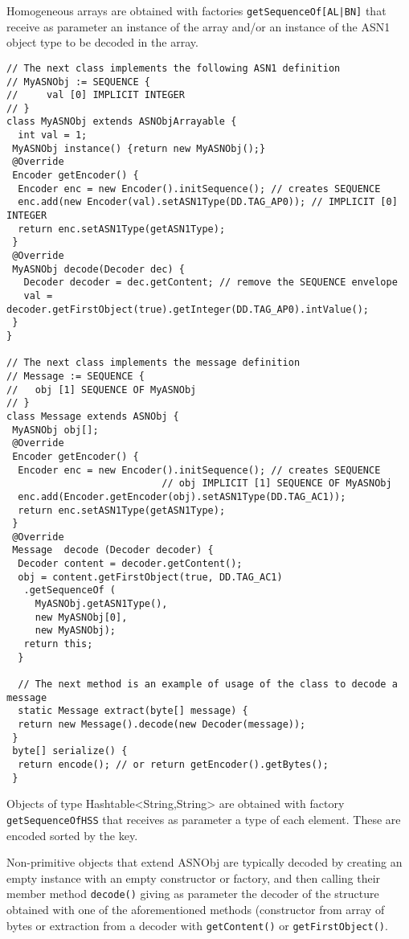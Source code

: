 \documentclass{book}
\newcommand{\mth}[1]{{\tt #1}}
\begin{document}
Homogeneous arrays are obtained with factories \mth{getSequenceOf[AL|BN]} that receive as parameter an instance of the array and/or an
instance of the ASN1 object type to be decoded in the array.

\begin{verbatim}
// The next class implements the following ASN1 definition
// MyASNObj := SEQUENCE {
//     val [0] IMPLICIT INTEGER
// }
class MyASNObj extends ASNObjArrayable {
  int val = 1;
 MyASNObj instance() {return new MyASNObj();}
 @Override
 Encoder getEncoder() {
  Encoder enc = new Encoder().initSequence(); // creates SEQUENCE
  enc.add(new Encoder(val).setASN1Type(DD.TAG_AP0)); // IMPLICIT [0] INTEGER
  return enc.setASN1Type(getASN1Type);
 }
 @Override
 MyASNObj decode(Decoder dec) {
   Decoder decoder = dec.getContent; // remove the SEQUENCE envelope
   val = decoder.getFirstObject(true).getInteger(DD.TAG_AP0).intValue();
 }
}

// The next class implements the message definition
// Message := SEQUENCE {
//   obj [1] SEQUENCE OF MyASNObj
// }
class Message extends ASNObj {
 MyASNObj obj[];
 @Override
 Encoder getEncoder() {
  Encoder enc = new Encoder().initSequence(); // creates SEQUENCE
                           // obj IMPLICIT [1] SEQUENCE OF MyASNObj
  enc.add(Encoder.getEncoder(obj).setASN1Type(DD.TAG_AC1)); 
  return enc.setASN1Type(getASN1Type);
 }
 @Override
 Message  decode (Decoder decoder) {
  Decoder content = decoder.getContent();
  obj = content.getFirstObject(true, DD.TAG_AC1)
   .getSequenceOf (
     MyASNObj.getASN1Type(),
     new MyASNObj[0], 
     new MyASNObj);
   return this;
  }

  // The next method is an example of usage of the class to decode a message
  static Message extract(byte[] message) {
  return new Message().decode(new Decoder(message));
 }
 byte[] serialize() {
  return encode(); // or return getEncoder().getBytes();
 }
\end{verbatim}

Objects of type Hashtable<String,String> are obtained with factory \mth{getSequenceOfHSS} that receives as parameter 
a type of each element. These are encoded sorted by the key.

Non-primitive objects that extend ASNObj are typically decoded by creating an empty instance with an empty constructor or factory,
and then calling their member method \mth{decode()} giving as parameter the decoder of the structure obtained with one of the aforementioned methods (constructor from array of bytes or extraction from a decoder with \mth{getContent()} or
\mth{getFirstObject()}.
\end{document}
